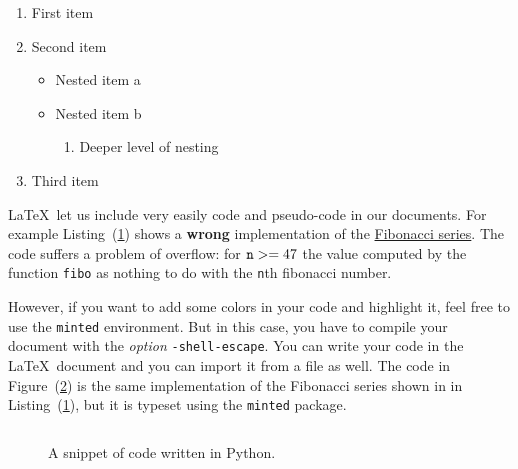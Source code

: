 \documentclass{article}
\newcommand{\latex}{\LaTeX}
\begin{document}
\begin{enumerate}
  \item First item
  \item Second item
  \begin{itemize}
    \item Nested item a
    \item Nested item b
    \begin{enumerate}
      \item Deeper level of nesting
    \end{enumerate}
  \end{itemize}
  \item Third item
\end{enumerate}

\latex\  let us include very easily code and pseudo-code in our documents.
For example Listing~(\ref{fibo}) shows a {\bfseries wrong} implementation
of the \href{https://en.wikipedia.org/wiki/Fibonacci\_number}{Fibonacci series}.
The code suffers a problem of overflow: for ${\tt n} >= 47$ the value
computed by the function {\tt fibo} as nothing to do with the {\tt n}th fibonacci number.

\begin{figure} \label{fibo}
\hrulefill
  \hrulefill
\end{figure}

However, if you want to add some colors in your code and highlight it, feel free
to use the {\tt minted} environment. But in this case, you have to compile your
document with the {\em option} {\tt -shell-escape}. You can write your code in
the \latex\ document and you can import it from a file as well. The
code in Figure~(\ref{fibo-minted}) is the same implementation of the
Fibonacci series shown in in Listing~(\ref{fibo}), but it is typeset using the {\tt minted} package.

\begin{figure}
\hrulefill
\inputminted{python}{fibo.py}
\caption{A snippet of code written in Python.}
\label{fibo-minted}
\hrulefill
\end{figure}
\end{document}
